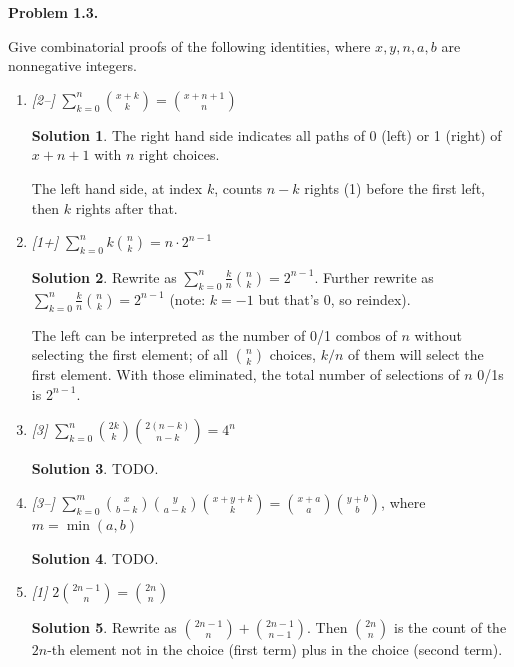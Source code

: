 \documentclass[11pt]{article}
\theoremstyle{definition}
\newtheorem*{solution}{Solution}
\newcounter{probnum}
\newcommand{\problem}[1]{%
  \setcounter{probnum}{#1}%
  \medskip
  \noindent\textbf{Problem 1.#1.}\quad
}
\begin{document}
\problem{3}
Give combinatorial proofs of the following identities, where $x,y,n,a,b$ are
nonnegative integers.

\begin{enumerate}[label=(\alph*)]
  \item \textit{[2--]} $\displaystyle\sum_{k=0}^{n}\binom{x+k}{k} = \binom{x+n+1}{n}$
    \begin{solution}
    The right hand side indicates all paths of 0 (left) or 1 (right) of $x+n+1$
    with $n$ right choices.

    The left hand side, at index $k$, counts $n-k$ rights (1) before the first
    left, then $k$ rights after that.
    \end{solution}

  \item \textit{[1+]} $\displaystyle\sum_{k=0}^{n}k\binom{n}{k} = n\cdot 2^{n-1}$
    \begin{solution}
    Rewrite as $\sum_{k=0}^{n} \frac{k}{n}\binom{n}{k} = 2^{n-1}$. Further rewrite
    as $\sum_{k=0}^{n} \frac{k}{n}\binom{n}{k} = 2^{n-1}$ (note: $k=-1$ but that's
    0, so reindex).

    The left can be interpreted as the number of 0/1 combos of $n$ without selecting
    the first element; of all $\binom{n}{k}$ choices, $k/n$ of them will select the
    first element. With those eliminated, the total number of selections of $n$ 0/1s
    is $2^{n-1}$.
    \end{solution}

  \item \textit{[3]} $\displaystyle\sum_{k=0}^{n}\binom{2k}{k}\binom{2(n-k)}{n-k} = 4^n$
    \begin{solution}
    TODO\@.
    \end{solution}

  \item \textit{[3--]}
    $\displaystyle\sum_{k=0}^{m}\binom{x}{b-k}\binom{y}{a-k}\binom{x+y+k}{k}
     = \binom{x+a}{a}\binom{y+b}{b}$,
    where $m = \min(a,b)$
    \begin{solution}
    TODO\@.
    \end{solution}

  \item \textit{[1]} $\displaystyle 2\binom{2n-1}{n} = \binom{2n}{n}$
    \begin{solution}
    Rewrite as $\binom{2n-1}{n} + \binom{2n-1}{n-1}$. Then $\binom{2n}{n}$ is the
    count of the $2n$-th element not in the choice (first term) plus in the choice
    (second term).
    \end{solution}


\end{enumerate}
\end{document}
